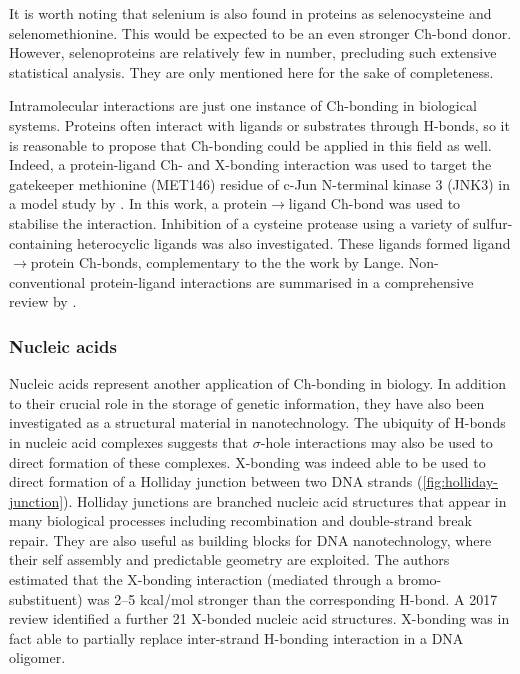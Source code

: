 \begin{refsection}
It is worth noting that selenium is also found in proteins as selenocysteine and selenomethionine.
This would be expected to be an even stronger Ch-bond donor.
However, selenoproteins are relatively few in number, precluding such extensive statistical analysis.\autocite{Iwaoka2015}
They are only mentioned here for the sake of completeness.

Intramolecular interactions are just one instance of Ch-bonding in biological systems.
Proteins often interact with ligands or substrates through H-bonds, so it is reasonable to propose that Ch-bonding could be applied in this field as well.
Indeed, a protein-ligand Ch- and X-bonding interaction was used to target the gatekeeper methionine (MET146) residue of c-Jun N-terminal kinase 3 (JNK3) in a model study by \citeauthor{Lange2015}.\autocite{Lange2015}
In this work, a protein$ \rightarrow $ligand Ch-bond was used to stabilise the interaction.
Inhibition of a cysteine protease using a variety of sulfur-containing heterocyclic ligands was also investigated.\autocite{Giroud2017}
These ligands formed ligand$ \rightarrow $protein Ch-bonds, complementary to the the work by Lange.
Non-conventional protein-ligand interactions are summarised in a comprehensive review by \citeauthor{Beno2015}.\autocite{Beno2015}

\subsubsection{Nucleic acids}
Nucleic acids represent another application of Ch-bonding in biology.
In addition to their crucial role in the storage of genetic information, they have also been investigated as a structural material in nanotechnology.
The ubiquity of H-bonds in nucleic acid complexes suggests that $ \sigma $-hole interactions may also be used to direct formation of these complexes.
X-bonding was indeed able to be used to direct formation of a Holliday junction between two DNA strands (\cref{fig:holliday-junction}).\autocite{Voth2007}
Holliday junctions are branched nucleic acid structures that appear in many biological processes including recombination and double-strand break repair.
They are also useful as building blocks for DNA nanotechnology, where their self assembly and predictable geometry are exploited.
The authors estimated that the X-bonding interaction (mediated through a bromo-substituent) was 2--5 kcal/mol stronger than the corresponding H-bond.
A 2017 review identified a further 21 X-bonded nucleic acid structures.\autocite{Kolar2017}
X-bonding was in fact able to partially replace inter-strand H-bonding interaction in a DNA oligomer.\autocite{Parker2012}


\end{refsection}
